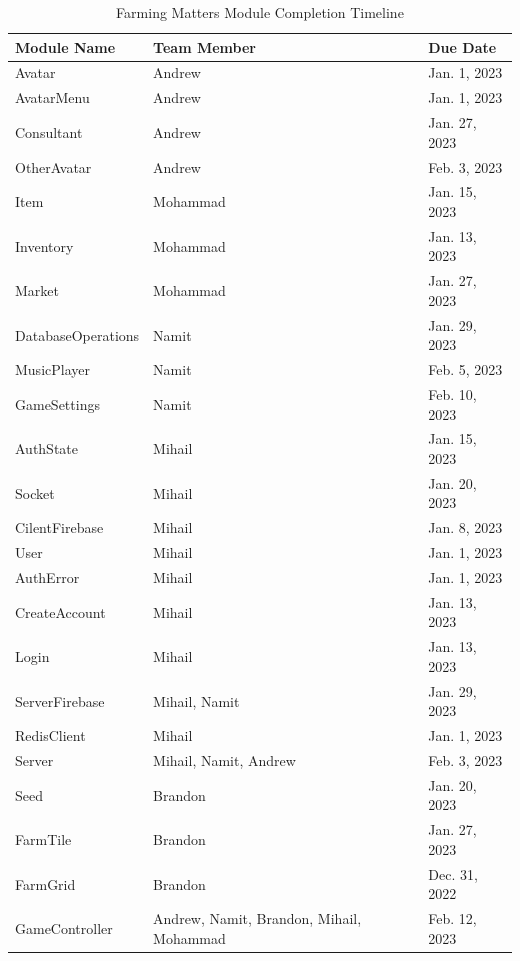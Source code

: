 \documentclass[12pt, titlepage]{article}
\begin{document}
\begin{table}[H]
\centering
\begin{tabular}{p{} p{}  p{}}
\toprule
Module Name & Team Member & Due Date \\
\midrule
Avatar & Andrew & Jan. 1, 2023\\
AvatarMenu & Andrew & Jan. 1, 2023\\
Consultant & Andrew & Jan. 27, 2023\\
OtherAvatar & Andrew & Feb. 3, 2023\\
Item & Mohammad & Jan. 15, 2023\\
Inventory & Mohammad & Jan. 13, 2023\\ 
Market & Mohammad & Jan. 27, 2023\\
DatabaseOperations & Namit & Jan. 29, 2023\\
MusicPlayer & Namit & Feb. 5, 2023\\
GameSettings & Namit & Feb. 10, 2023\\
AuthState & Mihail & Jan. 15, 2023\\
Socket & Mihail & Jan. 20, 2023\\
CilentFirebase & Mihail & Jan. 8, 2023\\
User & Mihail & Jan. 1, 2023\\
AuthError & Mihail & Jan. 1, 2023 \\
CreateAccount & Mihail & Jan. 13, 2023 \\
Login & Mihail & Jan. 13, 2023 \\
ServerFirebase & Mihail, Namit &  Jan. 29, 2023\\
RedisClient & Mihail & Jan. 1, 2023\\
Server & Mihail, Namit, Andrew & Feb. 3, 2023\\
Seed & Brandon & Jan. 20, 2023\\
FarmTile & Brandon & Jan. 27, 2023\\
FarmGrid & Brandon & Dec. 31, 2022\\
GameController & Andrew, Namit, Brandon, Mihail, Mohammad & Feb. 12, 2023 \\
\end{tabular}
\caption{Farming Matters Module Completion Timeline}
\label{TblMH}
\end{table}


% 

\newpage{}

\appendix
\end{document}
